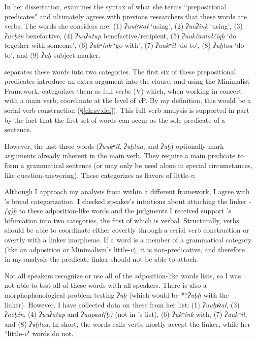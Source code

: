 In her dissertation, \citet{woo2007b} examines the syntax of what she terms ``prepositional predicates" and ultimately agrees with previous researchers that these words are verbs. The words she considers are: (1) \textit{ʔuuḥw̓ał} `using', (2) \textit{ʔuuʔink} `using', (3) \textit{ʔucḥin} benefactive, (4) \textit{ʔuuʔatup} benefactive/recipient, (5) \textit{ʔuukčamałčiqḥ} `do together with someone', (6) \textit{ʔukʷink} `go with', (7) \textit{ʔuukʷił} `do to', (8) \textit{ʔuḥtaa} `do to', and (9) \textit{ʔuḥ} subject marker.

\citeauthor{woo2007b} separates these words into two categories. The first six of these prepositional predicates introduce an extra argument into the clause, and using the Minimalist Framework, \citeauthor{woo2007b} categorizes them as full verbs (V) which, when working in concert with a main verb, coordinate at the level of \textit{v}P. By my definition, this would be a serial verb construction (\S\ref{ch:sv:def}). This full verb analysis is supported in part by the fact that the first set of words can occur as the sole predicate of a sentence.

However, the  last three words (\textit{ʔuukʷił}, \textit{ʔuḥtaa}, and \textit{ʔuḥ}) optionally mark arguments already inherent in the main verb. They require a main predicate to form a grammatical sentence (or may only be used alone in special circumstances, like question-answering). These \citeauthor{woo2007b} categorizes as flavors of little-\textit{v}.

Although I approach my analysis from within a different framework, I agree with \citeauthor{woo2007b}'s broad categorization. I checked speaker's intuitions about attaching the linker \textit{-(q)ḥ} to these adposition-like words and the judgments I received support \citeauthor{woo2007b}'s bifurcation into two categories, the first of which is verbal. Structurally, verbs should be able to coordinate either covertly through a serial verb construction or overtly with a linker morpheme. If a word is a member of a grammatical category (like an adposition or Minimalism's little-\textit{v}), it is non-predicative, and therefore in my analysis the predicate linker should not be able to attach.

Not all speakers recognize or use all of the adposition-like words \citeauthor{woo2007b} lists, so I was not able to test all of these words with all speakers. There is also a morphophonological problem testing \textit{ʔuḥ} (which would be *?\textit{ʔuḥḥ} with the linker). However, I have collected data on these from her list: (1) \textit{ʔuuḥw̓ał}, (3) \textit{ʔucḥin}, (4) \textit{ʔuuʔatup} and \textit{ʔuupaał(ḥ)} (not in \citeauthor{woo2007b}'s list), (6) \textit{ʔukʷink} with, (7) \textit{ʔuukʷił}, and (8) \textit{ʔuḥtaa}. In short, the words \citeauthor{woo2007b} calls verbs mostly accept the linker, while her ``little-\textit{v}" words do not.


